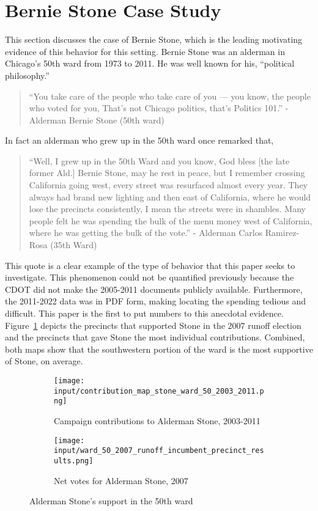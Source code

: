 \section{Bernie Stone Case Study}\label{sec:case_study}
This section discusses the case of Bernie Stone, which is the leading motivating evidence of this behavior for this setting.
Bernie Stone was an alderman in Chicago's 50th ward from 1973 to 2011.
He was well known for his, ``political philosophy.''

\begin{quotation}
    ``You take care of the people who take care of you — you know, the people who voted for you, That’s not Chicago politics, that’s Politics 101.'' - Alderman Bernie Stone (50th ward) \citep{BGA_berniequote}
\end{quotation}

In fact an alderman who grew up in the 50th ward once remarked that,

\begin{quotation}
    ``Well, I grew up in the 50th Ward and you know, God bless [the late former Ald.] Bernie Stone, may he rest in peace, but I remember crossing California going west, every street was resurfaced almost every year. They always had brand new lighting and then east of California, where he would lose the precincts consistently, I mean the streets were in shambles. Many people felt he was spending the bulk of the menu money west of California, where he was getting the bulk of the vote.'' - Alderman Carlos Ramirez-Rosa (35th Ward) \citep{ramirezrosaquote}
\end{quotation}

This quote is a clear example of the type of behavior that this paper seeks to investigate.
This phenomenon could not be quantified previously because the CDOT did not make the 2005-2011 documents publicly available. 
Furthermore, the 2011-2022 data was in PDF form, making locating the spending tedious and difficult.
This paper is the first to put numbers to this anecdotal evidence.
Figure~\ref{fig:stone_support_maps} depicts the precincts that supported Stone in the 2007 runoff election and the precincts that gave Stone the most individual contributions.
Combined, both maps show that the southwestern portion of the ward is the most supportive of Stone, on average.
\begin{figure}[H]
    \centering
    \begin{subfigure}[b]{0.45\textwidth} %
    \texttt{[image: input/contribution\_map\_stone\_ward\_50\_2003\_2011.png]}
    \caption{Campaign contributions to Alderman Stone, 2003-2011}
    \end{subfigure}
    \hfill %
    \begin{subfigure}[b]{0.45\textwidth}
    \texttt{[image: input/ward\_50\_2007\_runoff\_incumbent\_precinct\_results.png]}
    \caption{Net votes for Alderman Stone, 2007}
    \end{subfigure}
    \caption{Alderman Stone's support in the 50th ward}
    \label{fig:stone_support_maps}
\end{figure}


